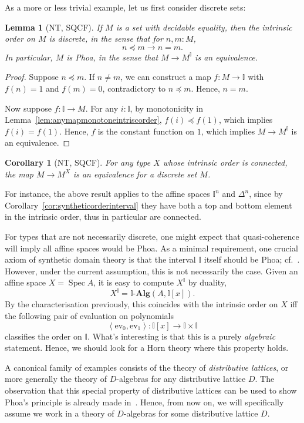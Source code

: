 \documentclass[12pt]{amsart}
\newtheorem{lemma}[theorem]{Lemma}
\newtheorem{corollary}[theorem]{Corollary}
\theoremstyle{definition}
\newcommand{\mb}[1]{\mathbf{#1}}
\newcommand{\mbb}[1]{\mathbb{#1}}
\newcommand{\I}{\mbb I}
\newcommand{\alg}{\text{-}\mb{Alg}}
\newcommand{\pair}[1]{\left\langle#1\right\rangle}
\newcommand{\ev}{\mathrm{ev}}
\newcommand{\spec}{\operatorname{Spec}}
\begin{document}
As a more or less trivial example, let us first consider discrete sets:

\begin{lemma}[NT, SQCF]\label{lem:discretephoa}
  If $M$ is a set with decidable equality, then the intrinsic order on $M$ is discrete, in the sense that for $n,m : M$,
  \[ n \preceq m \to n = m. \]
  In particular, $M$ is Phoa, in the sense that $M \to M^\I$ is an equivalence.
\end{lemma}
\begin{proof}
  Suppose $n \preceq m$. If $n \neq m$, we can construct a map $f : M \to \I$ with $f(n) = 1$ and $f(m) = 0$, contradictory to $n \preceq m$. Hence, $n = m$. 
  
  Now suppose $f : \I \to M$. For any $i:\I$, by monotonicity in Lemma~\ref{lem:anymapmonotoneintriscorder}, $f(i) \preceq f(1)$, which implies $f(i) = f(1)$. Hence, $f$ is the constant function on $1$, which implies $M \to M^\I$ is an equivalence.
\end{proof}

\begin{corollary}[NT, SQCF]\label{cor:connectedpreservediscrete}
  For any type $X$ whose intrinsic order is connected, the map $M \to M^X$ is an equivalence for a discrete set $M$.
\end{corollary}

For instance, the above result applies to the affine spaces $\I^n$ and $\Delta^n$, since by Corollary~\ref{cor:syntheticorderinterval} they have both a top and bottom element in the intrinsic order, thus in particular are connected.

For types that are not necessarily discrete, one might expect that quasi-coherence will imply all affine spaces would be Phoa. As a minimal requirement, one crucial axiom of synthetic domain theory is that the interval $\I$ itself should be Phoa; cf.~\cite{hyland2006first}. However, under the current assumption, this is not necessarily the case. Given an affine space $X = \spec A$, it is easy to compute $X^\I$ by duality,
\[ X^\I = \I\alg(A,\I[x]). \]
By the characterisation previously, this coincides with the intrinsic order on $X$ iff the following pair of evaluation on polynomials
\[ \pair{\ev_0,\ev_1} : \I[x] \to \I \times \I \]
classifies the order on $\I$. What's interesting is that this is a purely \emph{algebraic} statement. Hence, we should look for a Horn theory where this property holds.

A canonical family of examples consists of the theory of \emph{distributive lattices}, or more generally the theory of $D$-algebras for any distributive lattice $D$. The observation that this special property of distributive lattices can be used to show Phoa's principle is already made in~\cite{gratzer2024directed}. Hence, from now on, we will specifically assume we work in a theory of $D$-algebras for some distributive lattice $D$.
\end{document}
